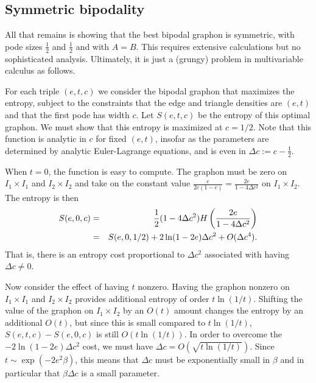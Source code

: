 \documentclass[12pt]{amsart}
\begin{document}
{\subsection{Symmetric bipodality}

All that remains is showing that the best bipodal graphon is symmetric, with pode sizes $\frac12$ and 
$\frac12$ and with $A=B$. This requires extensive 
calculations but no sophisticated analysis. Ultimately, it
is just a (grungy) problem in multivariable calculus as follows. 


For each triple $(e,t,c)$ we consider the bipodal graphon that maximizes the entropy, subject to the 
constraints that the edge and triangle densities are $(e,t)$ and that the first pode has width $c$. Let
$S(e,t,c)$ be the entropy of this optimal graphon. We must show that this entropy is maximized at 
$c=1/2$. Note that this function is analytic in $c$ for fixed $(e,t)$, insofar as the parameters 
are determined by analytic Euler-Lagrange equations, and is even in $\Delta c := c-\frac12$. 

When $t=0$, the function is easy to compute. The graphon must be zero on $I_1 \times I_1$ and 
$I_2 \times I_2$ and take on the constant value $\frac{e}{2c(1-c)} = \frac{2e}{1-4\Delta c^2}$ on $I_1 \times I_2$. 
The entropy is then 
\begin{eqnarray}  S(e,0,c) &=& \frac12 (1-4 \Delta c^2) H \left ( \frac{2e}{1-4 \Delta c^2} \right ) \cr
& = & S(e,0,1/2) + 2 \ln(1-2e) \Delta c^2 + O(\Delta c^4).
\end{eqnarray}
That is, there is an entropy cost proportional to $\Delta c^2$ associated with having $\Delta c \ne 0$.

Now consider the effect of having $t$ nonzero. Having the graphon nonzero on $I_1 \times I_1$ and $I_2 \times I_2$ provides
additional entropy of order $t \ln (1/t)$. Shifting the value of the graphon on $I_1 \times I_2$ by
an $O(t)$ amount changes the entropy by an additional $O(t)$, but since this is small compared 
to $t \ln(1/t)$, $S(e,t,c)-S(e,0,c)$ is still $O(t \ln(1/t))$. 
In order to overcome the $-2 \ln(1-2e) \Delta c^2$ cost, 
we must have $\Delta c = O(\sqrt{t \ln(1/t)})$. Since $t \sim \exp(-2e^2 \beta)$, this means that $\Delta c$
must be exponentially small in $\beta$ and in particular that $\beta \Delta c$ is a small parameter.

}
\end{document}
